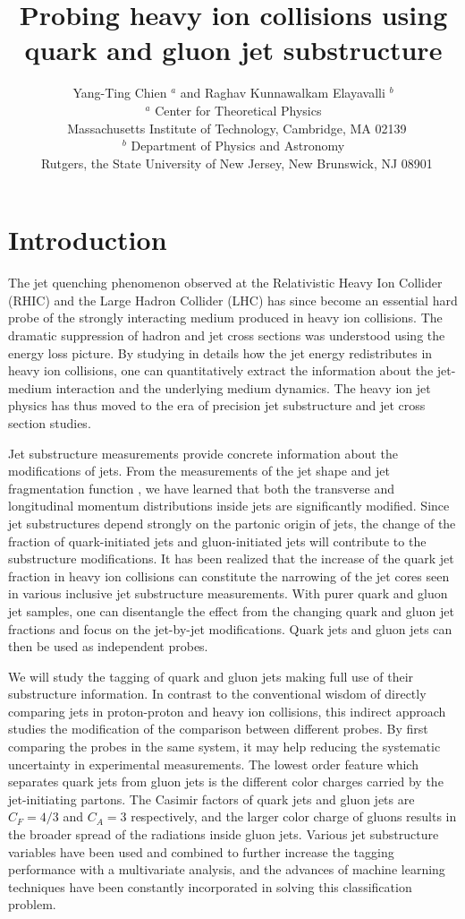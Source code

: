 \documentclass[notoc]{JHEP3}
\title{Probing heavy ion collisions using quark and gluon jet substructure}
\author{Yang-Ting Chien $^{a}$ and Raghav Kunnawalkam Elayavalli $^{b}$\\
$^{a}$ Center for Theoretical Physics\\
$~$ Massachusetts Institute of Technology, Cambridge, MA 02139\\
$^{b}$ Department of Physics and Astronomy\\
$~$ Rutgers, the State University of New Jersey, New Brunswick, NJ 08901
}
\begin{document}
\section{Introduction}
\label{sec:intro}



The jet quenching phenomenon observed at the Relativistic Heavy Ion Collider (RHIC) \cite{Adcox:2001jp,Adler:2002xw,Adcox:2004mh,Arsene:2004fa,Back:2004je,Adams:2005dq}
and the Large Hadron Collider (LHC)\cite{Aamodt:2010jd,Abelev:2012hxa,Abelev:2013kqa,Aad:2012vca,Aad:2014bxa,Chatrchyan:2013kwa,
Chatrchyan:2012gw,Chatrchyan:2014ava,Aad:2014wha,Chatrchyan:2013exa,
Adam:2015ewa,Chatrchyan:2012gt,Chatrchyan:2011sx,Chatrchyan:2012nia,Aad:2010bu,Aad:2013sla,Adam:2015doa,Aad:2015bsa,Khachatryan:2015lha} has since become an essential hard probe of the strongly interacting medium produced in heavy ion collisions. The dramatic suppression of hadron and jet cross sections was understood using the energy loss picture. By studying in details how the jet energy redistributes in heavy ion collisions, one can quantitatively extract the information about the jet-medium interaction and the underlying medium dynamics. The heavy ion jet physics has thus moved to the era of precision jet substructure and jet cross section studies.

Jet substructure measurements provide concrete information about the modifications of jets. From the measurements of the jet shape \cite{} and jet fragmentation function \cite{}, we have learned that both the transverse and longitudinal momentum distributions inside jets are significantly modified. Since jet substructures depend strongly on the partonic origin of jets, the change of the fraction of quark-initiated jets and gluon-initiated jets will contribute to the substructure modifications. It has been realized that the increase of the quark jet fraction in heavy ion collisions can constitute the narrowing of the jet cores seen in various inclusive jet substructure measurements. With purer quark and gluon jet samples, one can disentangle the effect from the changing quark and gluon jet fractions and focus on the jet-by-jet modifications. Quark jets and gluon jets can then be used as independent probes.

We will study the tagging of quark and gluon jets making full use of their substructure information. In contrast to the conventional wisdom of directly comparing jets in proton-proton and heavy ion collisions, this indirect approach studies the modification of the comparison between different probes. By first comparing the probes in the same system, it may help reducing the systematic uncertainty in experimental measurements. The lowest order feature which separates quark jets from gluon jets is the different color charges carried by the jet-initiating partons. The Casimir factors of quark jets and gluon jets are $C_F = 4/3$ and $C_A=3$ respectively, and the larger color charge of gluons results in the broader spread of the radiations inside gluon jets. Various jet substructure variables have been used and combined to further increase the tagging performance with a multivariate analysis, and the advances of machine learning techniques have been constantly incorporated in solving this classification problem.
\end{document}
